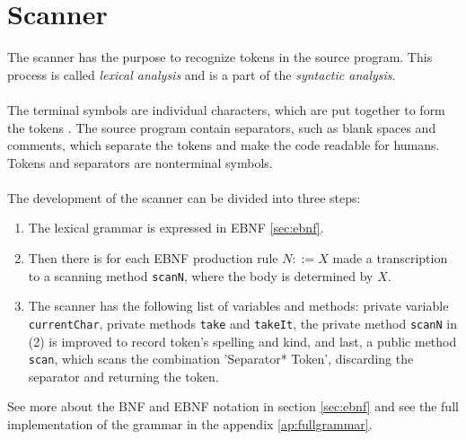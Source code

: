\section{Scanner}
The scanner has the purpose to recognize tokens in the source program. This process is called \textit{lexical analysis} and is a part of the \textit{syntactic analysis}.
\\
\\
The terminal symbols are individual characters, which are put together to form the tokens \cite{misc:spo}. The source program contain separators, such as blank spaces and comments, which separate the tokens and make the code readable for humans. Tokens and separators are nonterminal symbols.
\\
\\
The development of the scanner can be divided into three steps:
\begin{enumerate}
\item The lexical grammar is expressed in EBNF \ref{sec:ebnf}.
\item Then there is for each EBNF production rule $N::=X$ made a transcription to a scanning method \texttt{scanN}, where the body is determined by $X$.
\item The scanner has the following list of variables and methods: private variable \texttt{currentChar}, private methods \texttt{take} and \texttt{takeIt}, the private method \texttt{scanN} in (2) is improved to record token's spelling and kind, and last, a public method \texttt{scan}, which scans the combination 'Separator* Token', discarding the separator and returning the token.
\end{enumerate}

See more about the BNF and EBNF notation in section \ref{sec:ebnf} and see the full implementation of the grammar in the appendix \ref{ap:fullgrammar}.